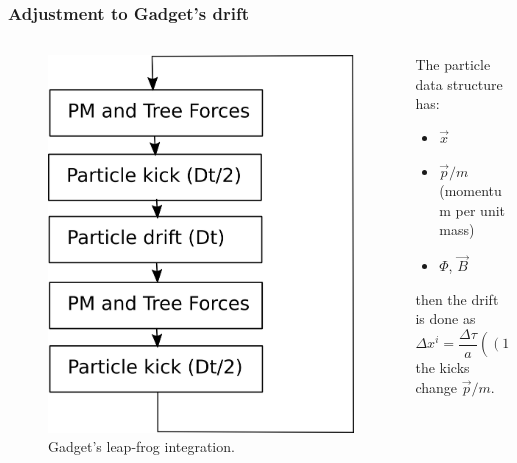 \documentclass{beamer}
\makeatletter
\newcommand{\mylabel}{%
}
\makeatother
\begin{document}
\begin{frame}[label=drift1]
    \frametitle{Adjustment to Gadget's drift\mylabel}
\begin{columns}
    \begin{column}{0.5\textwidth}
    \begin{figure}
        \centering
        \includegraphics[height=.8\textheight]{images/leap-frog.png}
        \caption{Gadget's leap-frog integration.}
    \end{figure}
    \end{column}
    \begin{column}{0.5\textwidth}
    The particle data structure has:
    \begin{itemize}
        \item $\vec x$
        \item $\vec p/m$ (momentum per unit mass)
        \item $\Phi$, $\vec B$
    \end{itemize}
    then the drift is done as
    \[
        \Delta x^i
        = \frac{\Delta\tau}{a}((1+3\Phi)p^i/m + c B^i a )
    \]
    the kicks change $\vec p/m$.
    \end{column}
\end{columns}
\end{frame}
\end{document}

